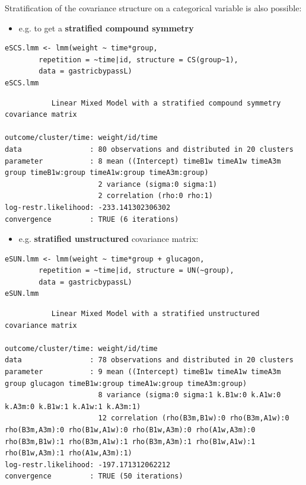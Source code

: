 \documentclass[12pt]{article}
\begin{document}
\noindent Stratification of the covariance structure on a categorical
variable is also possible:
\begin{itemize}
\item e.g. to get a \textbf{stratified compound symmetry}
\end{itemize}

\lstset{language=r,label= ,caption= ,captionpos=b,numbers=none}
\begin{lstlisting}
eSCS.lmm <- lmm(weight ~ time*group,
		repetition = ~time|id, structure = CS(group~1),
		data = gastricbypassL)
eSCS.lmm
\end{lstlisting}

\begin{verbatim}
	       Linear Mixed Model with a stratified compound symmetry covariance matrix 

outcome/cluster/time: weight/id/time 
data                : 80 observations and distributed in 20 clusters 
parameter           : 8 mean ((Intercept) timeB1w timeA1w timeA3m group timeB1w:group timeA1w:group timeA3m:group) 
                      2 variance (sigma:0 sigma:1) 
                      2 correlation (rho:0 rho:1) 
log-restr.likelihood: -233.141302306302 
convergence         : TRUE (6 iterations)
\end{verbatim}


\clearpage

\begin{itemize}
\item e.g. \textbf{stratified unstructured} covariance matrix:
\end{itemize}
\lstset{language=r,label= ,caption= ,captionpos=b,numbers=none}
\begin{lstlisting}
eSUN.lmm <- lmm(weight ~ time*group + glucagon,
		repetition = ~time|id, structure = UN(~group),
		data = gastricbypassL)
eSUN.lmm
\end{lstlisting}
\begin{verbatim}
	       Linear Mixed Model with a stratified unstructured covariance matrix 

outcome/cluster/time: weight/id/time 
data                : 78 observations and distributed in 20 clusters 
parameter           : 9 mean ((Intercept) timeB1w timeA1w timeA3m group glucagon timeB1w:group timeA1w:group timeA3m:group) 
                      8 variance (sigma:0 sigma:1 k.B1w:0 k.A1w:0 k.A3m:0 k.B1w:1 k.A1w:1 k.A3m:1) 
                      12 correlation (rho(B3m,B1w):0 rho(B3m,A1w):0 rho(B3m,A3m):0 rho(B1w,A1w):0 rho(B1w,A3m):0 rho(A1w,A3m):0 rho(B3m,B1w):1 rho(B3m,A1w):1 rho(B3m,A3m):1 rho(B1w,A1w):1 rho(B1w,A3m):1 rho(A1w,A3m):1) 
log-restr.likelihood: -197.171312062212 
convergence         : TRUE (50 iterations)
\end{verbatim}
\end{document}
